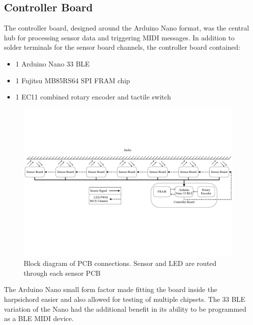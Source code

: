 \subsection{Controller Board}\label{controller-board}

The controller board, designed around the Arduino Nano format, was the central hub for processing sensor data and triggering MIDI messages. In addition to solder terminals for the sensor board channels, the controller board contained:

\begin{itemize}
    \item 1 Arduino Nano 33 BLE
    \item 1 Fujitsu MB85RS64 SPI FRAM chip
    \item 1 EC11 combined rotary encoder and tactile switch
\end{itemize}

\begin{figure}
    \centering
    \includegraphics[width=\linewidth]{src/images/block-diagram-2.pdf}
    \caption{Block diagram of PCB connections. Sensor and LED are routed through each sensor PCB}
    \label{fig:system-block-diagram}
\end{figure}

The Arduino Nano small form factor made fitting the board inside the harpsichord easier and also allowed for testing of multiple chipsets. The 33 BLE variation of the Nano had the additional benefit in its ability to be programmed as a BLE MIDI device.  

